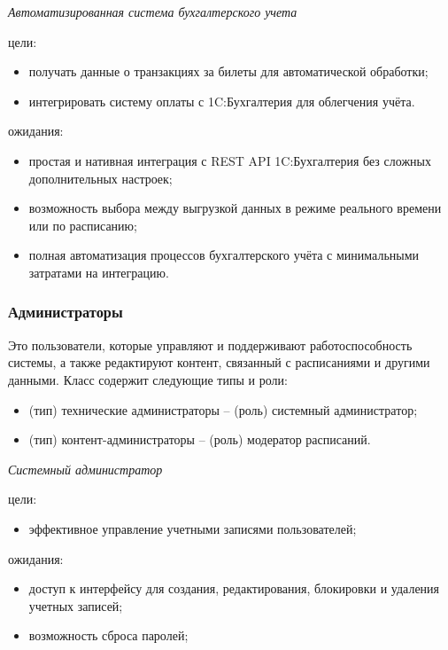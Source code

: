 \null

\noindent\textit{Автоматизированная система бухгалтерского учета}

\noindent цели:
\begin{itemize}
    \item получать данные о транзакциях за билеты для автоматической
    обработки;
    \item интегрировать систему оплаты с 1C:Бухгалтерия для облегчения
    учёта.
\end{itemize}

\noindent ожидания:
\begin{itemize}
    \item простая и нативная интеграция с REST API 1C:Бухгалтерия без
    сложных дополнительных настроек;
    \item возможность выбора между выгрузкой данных в режиме реального
    времени или по расписанию;
    \item полная автоматизация процессов бухгалтерского учёта с
    минимальными затратами на интеграцию.
\end{itemize}

\subsubsection*{Администраторы}

Это пользователи, которые управляют и поддерживают
работоспособность системы, а также редактируют контент, связанный с расписаниями
и другими данными. Класс содержит следующие типы и роли:
\begin{itemize}
    \item (тип) технические администраторы -- (роль) системный администратор;
    \item (тип) контент-администраторы -- (роль) модератор расписаний.
\end{itemize}

\null

\noindent\textit{Системный администратор}

\noindent цели:
\begin{itemize}
    \item эффективное управление учетными записями пользователей;
\end{itemize}

\noindent ожидания:
\begin{itemize}
    \item доступ к интерфейсу для создания, редактирования, блокировки и
    удаления учетных записей;
    \item возможность сброса паролей;
\end{itemize}

